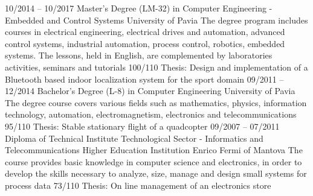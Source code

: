 \documentclass[9pt]{developercv} %
\begin{document}
\begin{entrylist}
	\entry
		{10/2014 -- 10/2017}
		{Master's Degree (LM-32) in Computer Engineering - Embedded and Control Systems}
		{University of Pavia}
		{The degree program includes courses in electrical engineering, electrical drives and automation, advanced control systems, industrial automation, process control, robotics, embedded systems. The lessons, held in English, are complemented by laboratories activities, seminars and tutorials}
		{100/110}
		{Thesis: Design and implementation of a Bluetooth based indoor localization system for the sport domain}
	\entry
		{09/2011 -- 12/2014}
		{Bachelor’s Degree (L-8) in Computer Engineering}
		{University of Pavia}
		{The degree course covers various fields such as mathematics, physics, information technology, automation, electromagnetism, electronics and telecommunications}
		{95/110}
		{Thesis: Stable stationary flight of a quadcopter}
	\entry
		{09/2007 -- 07/2011}
		{Diploma of Technical Institute Technological Sector - Informatics and Telecommunications}
		{Higher Education Institution Enrico Fermi of Mantova}
		{The course provides basic knowledge in computer science and electronics, in order to develop the skills necessary to analyze, size, manage and design small systems for process data}
		{73/110}
		{Thesis: On line management of an electronics store}
\end{entrylist}


\end{document}
